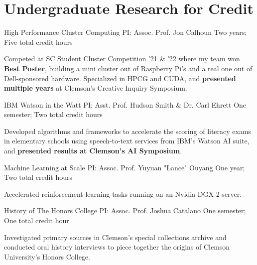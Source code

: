 \section{\textbf{Undergraduate Research for Credit}}
\vspace{-0.4mm}
\resumeSubHeadingListStart

\resumeProject
{High Performance Cluster Computing}
{PI: Assoc. Prof. Jon Calhoun}
{Two years; Five total credit hours}
{}
\resumeItemListStart
\item[] Competed at SC Student Cluster Competition '21 \& '22 where my team won \textbf{Best Poster}, building a mini cluster out of Raspberry Pi's and a real one out of Dell-sponsored hardware. Specialized in HPCG and CUDA, and \textbf{presented multiple years} at Clemson's Creative Inquiry Symposium.
\resumeItemListEnd

\resumeProject
{IBM Watson in the Watt}
{PI: Asst. Prof. Hudson Smith \& Dr. Carl Ehrett}
{One semester; Two total credit hours}
{}
\resumeItemListStart
\item[] Developed algorithms and frameworks to accelerate the scoring of literacy exams in elementary schools using speech-to-text services from IBM's Watson AI suite, and \textbf{presented results at Clemson's AI Symposium}.
\resumeItemListEnd

\resumeProject
{Machine Learning at Scale}
{PI: Assoc. Prof. Yuyuan "Lance" Ouyang}
{One year; Two total credit hours}
{}
\resumeItemListStart
\item[] Accelerated reinforcement learning tasks running on an Nvidia DGX-2 server.
\resumeItemListEnd

\resumeProject
{History of The Honors College}
{PI: Assoc. Prof. Joshua Catalano}
{One semester; One total credit hour}
{}
\resumeItemListStart
\item[] Investigated primary sources in Clemson's special collections archive and conducted oral history interviews to piece together the origins of Clemson University's Honors College.
\resumeItemListEnd

\resumeSubHeadingListEnd
\vspace{-6mm}
